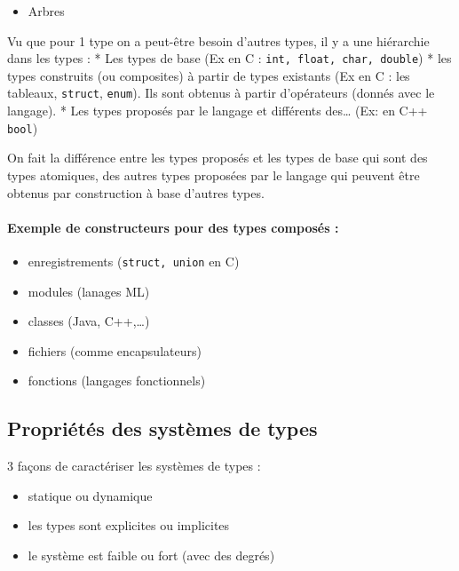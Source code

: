 \documentclass[]{article}
\providecommand{\tightlist}{%
  \setlength{\itemsep}{0pt}\setlength{\parskip}{0pt}}
\let\oldparagraph\paragraph
\renewcommand{\paragraph}[1]{\oldparagraph{#1}\mbox{}}
\begin{document}
\begin{itemize}
\tightlist
\item
  Arbres
\end{itemize}

Vu que pour 1 type on a peut-être besoin d'autres types, il y a une
hiérarchie dans les types : * Les types de base (Ex en C :
\texttt{int,\ float,\ char,\ double}) * les types construits (ou
composites) à partir de types existants (Ex en C : les tableaux,
\texttt{struct}, \texttt{enum}). Ils sont obtenus à partir d'opérateurs
(donnés avec le langage). * Les types proposés par le langage et
différents des\ldots{} (Ex: en C++ \texttt{bool})

On fait la différence entre les types proposés et les types de base qui
sont des types atomiques, des autres types proposées par le langage qui
peuvent être obtenus par construction à base d'autres types.

\paragraph{Exemple de constructeurs pour des types composés
:}\label{exemple-de-constructeurs-pour-des-types-composuxe9s}

\begin{itemize}
\tightlist
\item
  enregistrements (\texttt{struct,\ union} en C)
\item
  modules (lanages ML)
\item
  classes (Java, C++,\ldots{})
\item
  fichiers (comme encapsulateurs)
\item
  fonctions (langages fonctionnels)
\end{itemize}

\subsection{Propriétés des systèmes de
types}\label{propriuxe9tuxe9s-des-systuxe8mes-de-types}

3 façons de caractériser les systèmes de types :

\begin{itemize}
\tightlist
\item
  statique ou dynamique
\item
  les types sont explicites ou implicites
\item
  le système est faible ou fort (avec des degrés)
\end{itemize}
\end{document}
